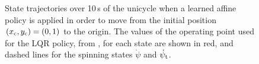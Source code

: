 \begin{figure}
\caption{State trajectories over 10$\,$s of the unicycle when a learned affine policy is applied in order to move from the initial position $(x_{\text{c}},y_{\text{c}}) = (0,1)$ to the origin. The values of the operating point used for the LQR policy, from , for each state are shown in red, and dashed lines for the spinning states $\dot\psi$ and $\dot\psi_{\text{t}}$.}
\label{fig:MLuni}
\end{figure}



